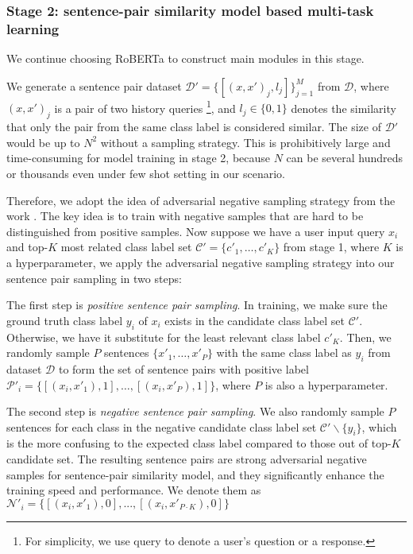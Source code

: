 \subsubsection*{Stage 2: sentence-pair similarity model based multi-task learning}
We continue choosing RoBERTa to construct main modules in this stage.

We generate a sentence pair dataset $\mathcal{D'}=\{[(x,x')_{j},l_{j}]\}_{j=1}^{M}$ from $\mathcal{D}$, where $(x, x')_{j}$ is a pair of two history queries \footnote{For simplicity, we use query to denote a user's question or a response.}, and $l_{j}\in\{0, 1\}$ denotes the similarity that only the pair from the same class label is considered similar. 
The size of $\mathcal{D'}$ would be up to $N^2$ without a sampling strategy. 
This is prohibitively large and time-consuming for model training in stage 2, because $N$ can be several hundreds or thousands even under few shot setting in our scenario. 

Therefore, we adopt the idea of adversarial negative sampling strategy from the work \cite{bamler2020extreme}. 
The key idea is to train with negative samples that are hard to be distinguished from positive samples. 
Now suppose we have a user input query $x_{i}$ and top-$K$ most related class label set $\mathcal{C'}=\{c'_{1}, \dots, c'_{K}\}$ from stage 1, where $K$ is a hyperparameter, we apply the adversarial negative sampling strategy into our sentence pair sampling in two steps:

The first step is \emph{positive sentence pair sampling}. 
In training, we make sure the ground truth class label $y_{i}$ of $x_{i}$ exists in the candidate class label set $\mathcal{C'}$. 
Otherwise, we have it substitute for the least relevant class label $c'_{K}$. 
Then, we randomly sample $P$ sentences $\{x'_{1}, \dots, x'_{P}\}$ with the same class label as $y_{i}$ from dataset $\mathcal{D}$ to form the set of sentence pairs with positive label $\mathcal{P'}_{i}=\{[(x_{i}, x'_{1}), 1], \dots, [(x_{i}, x'_{P}), 1]\}$, where $P$ is also a hyperparameter. 

The second step is \emph{negative sentence pair sampling}.
We also randomly sample $P$ sentences for each class in the negative candidate class label set $\mathcal{C'}\backslash \{y_{i}\}$, which is the more confusing to the expected class label compared to those out of top-$K$ candidate set.
The resulting sentence pairs are strong adversarial negative samples for sentence-pair similarity model, and they significantly enhance the training speed and performance. 
We denote them as $\mathcal{N'}_{i}=\{[(x_{i}, x'_{1}), 0], ..., [(x_{i}, x'_{P\cdot K}), 0]\}$

